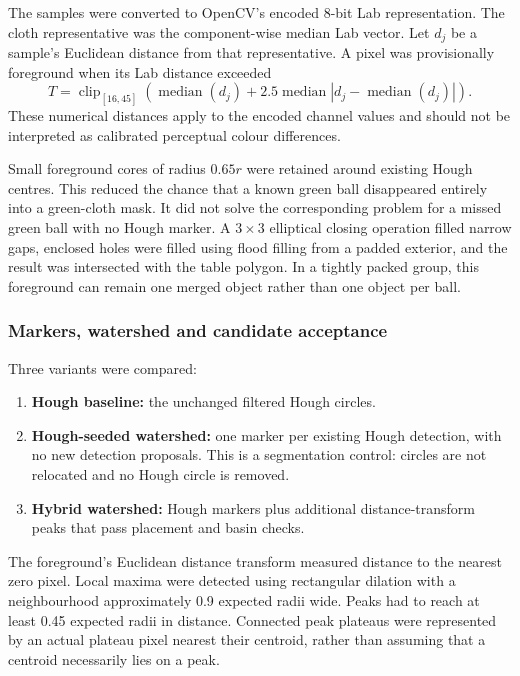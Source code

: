 The samples were converted to OpenCV's encoded 8-bit Lab representation.
The cloth representative was the component-wise median Lab vector. Let
$d_j$ be a sample's Euclidean distance from that representative. A pixel
was provisionally foreground when its Lab distance exceeded
\[
 T=\operatorname{clip}_{[16,45]}\left(
      \operatorname{median}(d_j)
      +2.5\operatorname{median}\left|d_j-\operatorname{median}(d_j)\right|
    \right).
\]
These numerical distances apply to the encoded channel values and should
not be interpreted as calibrated perceptual colour differences.

Small foreground cores of radius $0.65r$ were retained around existing
Hough centres. This reduced the chance that a known green ball disappeared
entirely into a green-cloth mask. It did not solve the corresponding
problem for a missed green ball with no Hough marker. A $3\times3$
elliptical closing operation filled narrow gaps, enclosed holes were
filled using flood filling from a padded exterior, and the result was
intersected with the table polygon. In a tightly packed group, this
foreground can remain one merged object rather than one object per ball.

\subsubsection{Markers, watershed and candidate acceptance}

Three variants were compared:
\begin{enumerate}
\item \textbf{Hough baseline:} the unchanged filtered Hough circles.
\item \textbf{Hough-seeded watershed:} one marker per existing Hough
detection, with no new detection proposals. This is a segmentation
control: circles are not relocated and no Hough circle is removed.
\item \textbf{Hybrid watershed:} Hough markers plus additional
distance-transform peaks that pass placement and basin checks.
\end{enumerate}

The foreground's Euclidean distance transform measured distance to the
nearest zero pixel. Local maxima were detected using rectangular dilation
with a neighbourhood approximately 0.9 expected radii wide. Peaks had to
reach at least 0.45 expected radii in distance. Connected peak plateaus
were represented by an actual plateau pixel nearest their centroid,
rather than assuming that a centroid necessarily lies on a peak.

